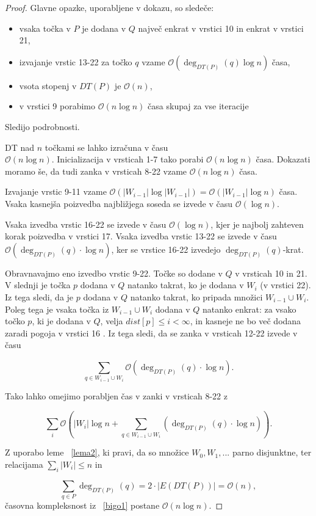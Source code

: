 \documentclass[a4paper, 12pt]{book}
\newcommand{\OO}{\ensuremath{\mathcal{O}}} %
\begin{document}
\begin{proof}
Glavne opazke, uporabljene v dokazu, so sledeče:
\begin{itemize}
\item vsaka točka v $P$ je dodana v $Q$ največ enkrat v vrstici 10 in enkrat v vrstici 21,
\item izvajanje vrstic 13-22 za točko $q$ vzame $\OO(\deg_{DT(P)}(q)\log n)$ časa,
\item vsota stopenj v $DT(P)$ je $\OO(n)$,
\item v vrstici 9 porabimo $\OO(n\log n)$ časa skupaj za vse iteracije
\end{itemize}
Sledijo podrobnosti.

DT nad $n$ točkami se lahko izračuna v času \\ $\OO(n\log n)$. Inicializacija v vrsticah 1-7 tako porabi $\OO(n\log n)$ časa. Dokazati moramo še, da tudi zanka v vrsticah 8-22 vzame $\OO(n\log n)$ časa.

Izvajanje vrstic 9-11 vzame $\OO(|W_{i-1}|\log |W_{i-1}|) = \OO(|W_{i-1}|\log n)$ časa. Vsaka kasnejša poizvedba najbližjega soseda se izvede v času $\OO(\log n)$.

Vsaka izvedba vrstic 16-22 se izvede v času $\OO(\log n)$, kjer je najbolj zahteven korak poizvedba v vrstici 17. Vsaka izvedba vrstic 13-22 se izvede v času $\OO(\deg_{DT(P)}(q)\cdot\log n)$, ker se vrstice 16-22 izvedejo $\deg_{DT(P)}(q)$-krat.

Obravnavajmo eno izvedbo vrstic 9-22. Točke so dodane v $Q$ v vrsticah 10 in 21. V slednji je točka $p$ dodana v $Q$ natanko takrat, ko je dodana v $W_i$ (v vrstici 22). Iz tega sledi, da je $p$ dodana v $Q$ natanko takrat, ko pripada množici $W_{i-1}\cup W_i$. Poleg tega je vsaka točka iz $W_{i-1}\cup W_i$ dodana v $Q$ natanko enkrat: za vsako točko $p$, ki je dodana v $Q$, velja $dist[p]\leq i < \infty$, in kasneje ne bo več dodana zaradi pogoja v vrstici 16
. Iz tega sledi, da se zanka v vrsticah 12-22 izvede v času

\begin{equation}
\sum_{q\in W_{i-1}\cup W_i} \OO(\deg_{DT(P)}(q) \cdot \log n).
\end{equation}

Tako lahko omejimo porabljen čas v zanki v vrsticah 8-22 z

\begin{equation}
\label{bigo1}
\sum_i \OO \left( |W_i|\log n + \sum_{q\in W_{i-1}\cup W_i} (\deg_{DT(P)}(q) \cdot \log n) \right) .
\end{equation}

Z uporabo leme ~\ref{lema2}, ki pravi, da so množice $W_0,W_1,...$ parno disjunktne, ter relacijama $\sum_i |W_i| \leq n$ in 

\begin{equation}
\sum_{q \in P} \deg_{DT(P)}(q) = 2 \cdot |E(DT(P))| = \OO(n),
\end{equation}
časovna kompleksnost iz ~\ref{bigo1} postane $\OO(n\log n)$.
\end{proof}
\end{document}

